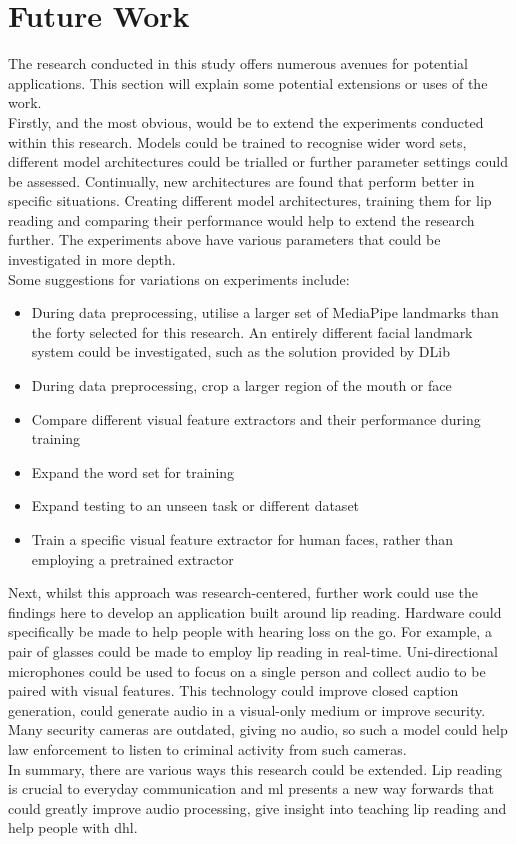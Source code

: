 \section{Future Work}
The research conducted in this study offers numerous avenues for potential applications. This section will explain some potential extensions or uses of the work.\\
Firstly, and the most obvious, would be to extend the experiments conducted within this research. Models could be trained to recognise wider word sets, different model architectures could be trialled or further parameter settings could be assessed. Continually, new architectures are found that perform better in specific situations. Creating different model architectures, training them for lip reading and comparing their performance would help to extend the research further. The experiments above have various parameters that could be investigated in more depth.\\
Some suggestions for variations on experiments include:
\begin{itemize}
    \item During data preprocessing, utilise a larger set of MediaPipe landmarks than the forty selected for this research. An entirely different facial landmark system could be investigated, such as the solution provided by DLib
    \item During data preprocessing, crop a larger region of the mouth or face
    \item Compare different visual feature extractors and their performance during training
    \item Expand the word set for training
    \item Expand testing to an unseen task or different dataset
    \item Train a specific visual feature extractor for human faces, rather than employing a pretrained extractor
\end{itemize}
Next, whilst this approach was research-centered, further work could use the findings here to develop an application built around lip reading. Hardware could specifically be made to help people with hearing loss on the go. For example, a pair of glasses could be made to employ lip reading in real-time. Uni-directional microphones could be used to focus on a single person and collect audio to be paired with visual features. This technology could improve closed caption generation, could generate audio in a visual-only medium or improve security. Many security cameras are outdated, giving no audio, so such a model could help law enforcement to listen to criminal activity from such cameras.\\
In summary, there are various ways this research could be extended. Lip reading is crucial to everyday communication and \acrlong{ml} presents a new way forwards that could greatly improve audio processing, give insight into teaching lip reading and help people with \acrfull{dhl}.